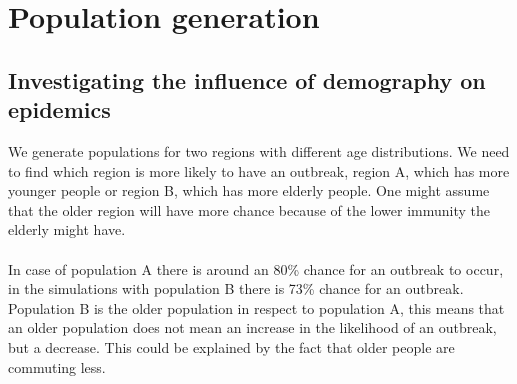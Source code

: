 \documentclass[runningheads]{llncs}
\begin{document}
	\newpage
	\noindent
	\section{Population generation}
	
	\subsection{Investigating the influence of demography on epidemics}
	We generate populations for two regions with different age distributions. We need to find which region is more likely to have an outbreak, region A, which has more younger people or region B, which has more elderly people. One might assume that the older region will have more chance because of the lower immunity the elderly might have.
	\\
	\\
	\noindent
	In case of population A there is around an 80\% chance for an outbreak to occur, in the simulations with population B there is 73\% chance for an outbreak. Population B is the older population in respect to population A, this means that an older population does not mean an increase in the likelihood of an outbreak, but a decrease. This could be explained by the fact that older people are commuting less.
	
\end{document}
